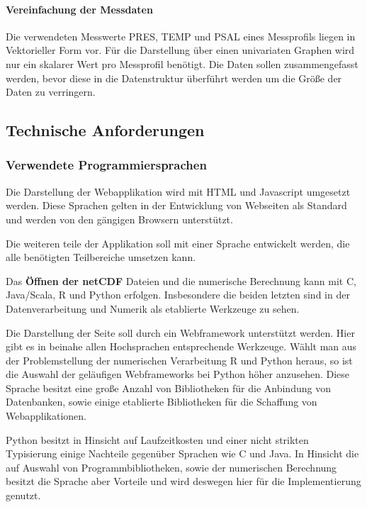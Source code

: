  

\paragraph{Vereinfachung der Messdaten}
Die verwendeten Messwerte PRES, TEMP und PSAL eines Messprofils liegen in Vektorieller Form vor. Für die Darstellung über einen univariaten Graphen wird nur ein skalarer Wert pro Messprofil benötigt. Die Daten sollen zusammengefasst werden, bevor diese in die Datenstruktur überführt werden um die Größe der Daten zu verringern. 
 

\subsection{Technische Anforderungen  }

\subsubsection{Verwendete Programmiersprachen}

Die Darstellung der Webapplikation wird mit HTML und Javascript umgesetzt werden. Diese Sprachen gelten in der Entwicklung von Webseiten als Standard und werden von den gängigen Browsern unterstützt.

Die weiteren teile der Applikation soll mit einer Sprache entwickelt werden, die alle benötigten Teilbereiche umsetzen kann.

Das \textbf{Öffnen der netCDF} Dateien und die numerische Berechnung kann mit C, Java/Scala, R und Python erfolgen. Insbesondere die beiden letzten sind in der Datenverarbeitung und Numerik als etablierte Werkzeuge zu sehen.

Die Darstellung der Seite soll durch ein Webframework unterstützt werden. Hier gibt es in beinahe allen Hochsprachen entsprechende Werkzeuge. Wählt man aus der Problemstellung der numerischen Verarbeitung R und Python heraus, so ist die Auswahl der geläufigen Webframeworks bei Python höher anzusehen. Diese Sprache besitzt eine große Anzahl von Bibliotheken für die Anbindung von Datenbanken, sowie einige etablierte Bibliotheken für die Schaffung von Webapplikationen.  

Python besitzt in Hinsicht auf Laufzeitkosten und einer nicht strikten Typisierung einige Nachteile gegenüber Sprachen wie C und Java. In Hinsicht die auf Auswahl von Programmbibliotheken, sowie der numerischen Berechnung besitzt die Sprache aber Vorteile und wird deswegen hier für die Implementierung genutzt.



